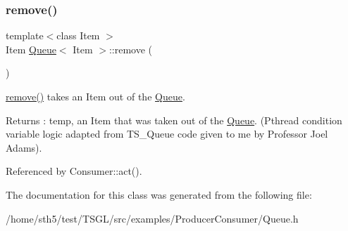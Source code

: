 \subsubsection{\texorpdfstring{remove()}{remove()}}
{\footnotesize\ttfamily template$<$class Item $>$ \\
Item \hyperlink{class_queue}{Queue}$<$ Item $>$\+::remove (\begin{DoxyParamCaption}{ }\end{DoxyParamCaption})}

\hyperlink{class_queue_a5ebe3e112ee1abf233f113ed41e4df29}{remove()} takes an Item out of the \hyperlink{class_queue}{Queue}. \begin{DoxyReturn}{Returns}
\+: temp, an Item that was taken out of the \hyperlink{class_queue}{Queue}. (Pthread condition variable logic adapted from T\+S\+\_\+\+Queue code given to me by Professor Joel Adams). 
\end{DoxyReturn}


Referenced by Consumer\+::act().



The documentation for this class was generated from the following file\+:\begin{DoxyCompactItemize}
\item 
/home/sth5/test/\+T\+S\+G\+L/src/examples/\+Producer\+Consumer/Queue.\+h\end{DoxyCompactItemize}
